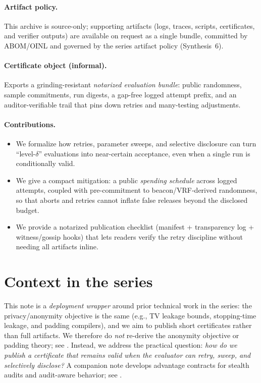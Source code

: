 \documentclass[11pt]{article}
\begin{document}
\paragraph{Artifact policy.}
This archive is source-only; supporting artifacts (logs, traces, scripts, certificates, and verifier outputs) are available on request as a single bundle, committed by ABOM/OINL and governed by the series artifact policy (Synthesis~6).\cite{series:artifactpolicy}


\paragraph{Certificate object (informal).}
Exports a grinding-resistant \emph{notarized evaluation bundle}: public randomness, sample commitments, run digests, a gap-free logged attempt prefix,
and an auditor-verifiable trail that pins down retries and many-testing adjustments.
\paragraph{Contributions.}
\begin{itemize}
\item We formalize how retries, parameter sweeps, and selective disclosure can turn ``level-$\delta$'' evaluations into near-certain acceptance, even when a single run is conditionally valid.
\item We give a compact mitigation: a public \emph{spending schedule} across logged attempts, coupled with pre-commitment to beacon/VRF-derived randomness, so that aborts and retries cannot inflate false releases beyond the disclosed budget.
\item We provide a notarized publication checklist (manifest + transparency log + witness/gossip hooks) that lets readers verify the retry discipline without needing all artifacts inline.
\end{itemize}

\section{Context in the series}
This note is a \emph{deployment wrapper} around prior technical work in the series:
the privacy/anonymity objective is the same (e.g., TV leakage bounds, stopping-time leakage, and padding compilers),
and we aim to publish short certificates rather than full artifacts.
We therefore do \emph{not} re-derive the anonymity objective or padding theory; see
\cite{series:schedcompiler,series:spectral,series:knapsacktransport,series:manytestinglowerbounds}.
Instead, we address the practical question:
\emph{how do we publish a certificate that remains valid when the evaluator can retry, sweep, and selectively disclose?} A companion note develops advantage contracts for stealth audits and audit-aware behavior; see \cite{series:advantagecontracts}.
\end{document}
